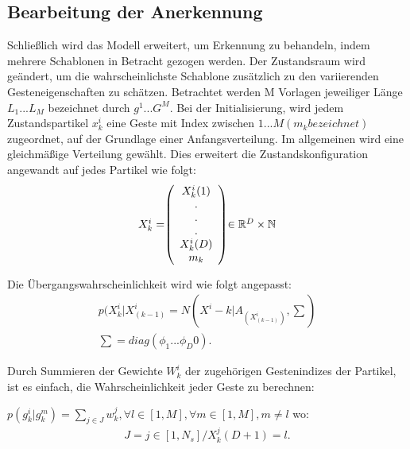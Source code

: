 \documentclass{llncs}
\begin{document}
\subsection{Bearbeitung der Anerkennung}
Schließlich wird das Modell erweitert, um Erkennung zu behandeln, indem mehrere Schablonen in Betracht gezogen werden. Der Zustandsraum wird geändert, um die wahrscheinlichste Schablone zusätzlich zu den variierenden Gesteneigenschaften zu schätzen.
Betrachtet werden M Vorlagen jeweiliger Länge $L_1 ... L_M$ bezeichnet durch $g^1 ... G^M$. Bei der Initialisierung, wird jedem Zustandspartikel $x^i_k$ eine Geste mit Index zwischen $1 ... M (m_k bezeichnet)$ zugeordnet, auf der Grundlage einer Anfangsverteilung. Im allgemeinen wird eine gleichmäßige Verteilung gewählt. Dies erweitert die Zustandskonfiguration angewandt auf jedes Partikel wie folgt: 
\begin{equation}
\left.\begin{array}{l}
X^i_k =
 $$  \left(\begin{array}{crl}
 X^i_k (1)\\		
				.\\
				.\\
				.\\
			X^i_k (D)\\
				m_k\\ 
				
				\end{array}\right)
		$$ \in \mathbb{R}^D \times \mathbb{N}						
\end{array}\right.		
\end{equation}	

Die Übergangswahrscheinlichkeit wird wie folgt angepasst:
\begin{equation}
\left.\begin{array}{l}				
p(X^i_k|X^i_(k-1) = N(X^i-k|A_(X^i_(k-1)), \sum)\\
			\sum =diag(\phi_1 ... \phi_D 0).								
\end{array}\right.		
\end{equation}				
			
Durch Summieren der Gewichte $W^i_k$  der zugehörigen Gestenindizes der Partikel, ist es einfach, die Wahrscheinlichkeit jeder Geste zu berechnen:

$p(g^i_k|g^m_k) =\sum_{j\in J}^{} w^j_k,  \forall l \in [1,M], \forall m \in [1,M], m \neq l
$
wo:
 \begin{equation}
 \left.\begin{array}{l}	
J = {j \in [1,N_s]/ X^j_k (D+1) = l}.									
\end{array}\right.		
\end{equation}	
\end{document}
